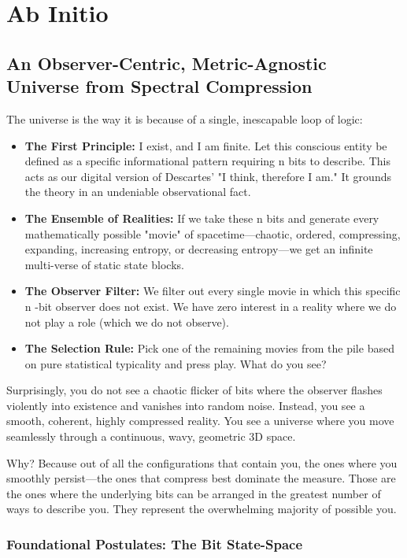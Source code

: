 \chapter{Ab Initio}

\section{An Observer-Centric, Metric-Agnostic Universe from Spectral Compression}

The universe is the way it is because of a single, inescapable loop of logic:

\begin{itemize}
\item \textbf{The First Principle:} I exist, and I am finite. Let this conscious entity be defined as a specific informational pattern requiring n bits to describe. This acts as our digital version of Descartes' "I think, therefore I am." It grounds the theory in an undeniable observational fact.
\item \textbf{The Ensemble of Realities:} If we take these n bits and generate every mathematically possible "movie" of spacetime—chaotic, ordered, compressing, expanding, increasing entropy, or decreasing entropy—we get an infinite multi-verse of static state blocks.
\item \textbf{The Observer Filter:} We filter out every single movie in which this specific n -bit observer does not exist. We have zero interest in a reality where we do not play a role (which we do not observe).
\item \textbf{The Selection Rule:} Pick one of the remaining movies from the pile based on pure statistical typicality and press play. What do you see?
\end{itemize}

Surprisingly, you do not see a chaotic flicker of bits where the observer flashes violently into existence and vanishes into random noise.
Instead, you see a smooth, coherent, highly compressed reality. You see a universe where you move seamlessly through a continuous, wavy, geometric 3D space.

Why? Because out of all the configurations that contain you, the ones where you smoothly persist—the ones that compress best 
dominate the measure. Those are the ones where the underlying bits can be arranged in the greatest number of ways to describe you.
They represent the overwhelming majority of possible you.


\subsection{Foundational Postulates: The Bit State-Space}

